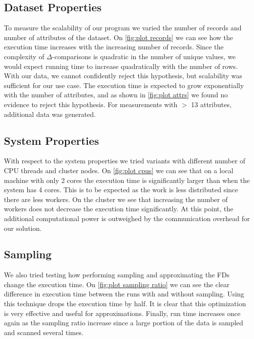 \documentclass{article}
\begin{document}
    \subsection{Dataset Properties}
    To measure the scalability of our program we varied the number of records and number of attributes of the dataset. On \autoref{fig:plot records} we can see how the execution time increases with the increasing number of records. Since the complexity of $\Delta$-comparisons is quadratic in the number of unique values, we would expect running time to increase quadratically with the number of rows. With our data, we cannot confidently reject this hypothesis, but scalability was sufficient for our use case. The execution time is expected to grow exponentially with the number of attributes, and as shown in \autoref{fig:plot attrs} we found no evidence to reject this hypothesis. For measurements with $>$ 13 attributes, additional data was generated.
    
    \subsection{System Properties}
    With respect to the system properties we tried variants with different number of CPU threads and cluster nodes. On \autoref{fig:plot cpus} we can see that on a local machine with only 2 cores the execution time is significantly larger than when the system has 4 cores. This is to be expected as the work is less distributed since there are less workers. On the cluster we see that increasing the number of workers does not decrease the execution time significantly. At this point, the additional computational power is outweighed by the communication overhead for our solution.
    
    \subsection{Sampling}
    
    We also tried testing how performing sampling and approximating the FDs change the execution time. On \autoref{fig:plot sampling ratio} we can see the clear difference in execution time between the runs with and without sampling. Using this technique drops the execution time by half. It is clear that this optimization is very effective and useful for approximations. Finally, run time increases once again as the sampling ratio increase since a large portion of the data is sampled and scanned several times.  
\end{document}
